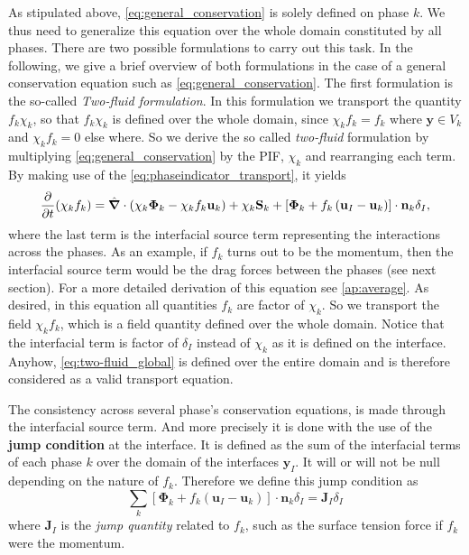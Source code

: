 As stipulated above, \ref{eq:general_conservation} is solely defined on phase $k$.
We thus need to generalize this equation over the whole domain constituted by all phases.  
There are two possible formulations to carry out this task.
In the following, we give a brief overview of both formulations in the case of a general conservation equation such as \ref{eq:general_conservation}.
The first formulation is the so-called \textit{Two-fluid formulation}.
In this formulation we transport the quantity $f_k\chi_k$, so that $f_k\chi_k$ is defined over the whole domain, since $\chi_k f_k = f_k$ where $\textbf{y} \in V_k$ and $\chi_k f_k = 0$ else where.
So we derive the so called \textit{two-fluid} formulation by multiplying \ref{eq:general_conservation} by the PIF, $\chi_k$ and rearranging each term. 
By making use of the \ref{eq:phaseindicator_transport}, it yields  
\begin{equation}
    \frac{\partial}{\partial t} (\chi_k f_k)
    = \hat{\bm{\nabla}} \cdot (\chi_k \bm{\Phi}_k - \chi_k f_k \textbf{u}_k)
    + \chi_k \textbf{S}_k
    + \left[
        \bm{\Phi}_k 
        + f_k 
        \left(
            \textbf{u}_I
            - \textbf{u}_k
        \right) 
    \right]
    \cdot \textbf{n}_k \delta_I, 
    \label{eq:two-fluid_global}
\end{equation}
where the last term is the interfacial source term representing the interactions across the phases. 
As an example, if $f_k$ turns out to be the momentum, then the interfacial source term would be the drag forces between the phases (see next section). 
For a more detailed derivation of this equation see \ref{ap:average}.
As desired, in this equation all quantities $f_k$ are factor of $\chi_k$. 
So we transport the field $\chi_k f_k$, which is a field quantity defined over the whole domain. 
Notice that the interfacial term is factor of $\delta_I$ instead of $\chi_k$ as it is defined on the interface.
Anyhow, \ref{eq:two-fluid_global} is defined over the entire domain and is therefore considered as a valid transport equation. 

The consistency across several phase's conservation equations, is made through the interfacial source term.  
And more precisely it is done with the use of the \textbf{jump condition} at the interface.
It is defined as the sum of the interfacial terms of each phase $k$ over the domain of the interfaces $\textbf{y}_I$. 
It will or will not be null depending on the nature of $f_k$. 
Therefore we define this jump condition as
\begin{equation}
    \sum_k 
    \left[
        \bm{\Phi}_k 
        + f_k 
        \left(
            \textbf{u}_I
            - \textbf{u}_k
        \right) 
    \right]
    \cdot \textbf{n}_k\delta_I
    = \textbf{J}_I\delta_I
    \label{eq:general_jump}
\end{equation}
where $\textbf{J}_I$ is the \textit{jump quantity} related to $f_k$, such as the surface tension force if $f_k$ were the momentum.

